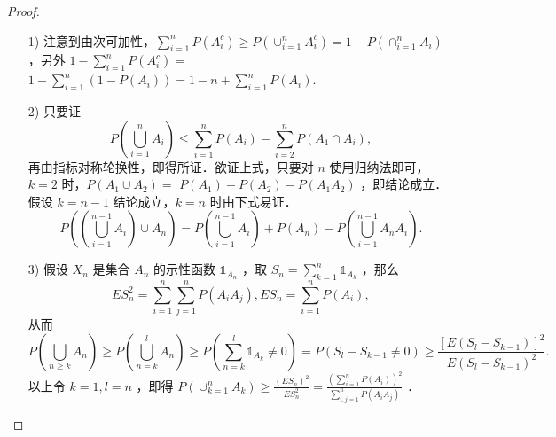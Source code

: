 \begin{proof}
    \begin{enumerate}
        \item[1)] 注意到由次可加性，$\sum_{i=1}^n P\left(A_i^c\right) \geq P\left(\cup_{i=1}^n A_i^c\right)=1-P\left(\cap_{i=1}^n A_i\right)$ ，另外 $1-\sum_{i=1}^n P\left(A_i^c\right)=$ $1-\sum_{i=1}^n\left(1-P\left(A_i\right)\right)=1-n+\sum_{i=1}^n P\left(A_i\right)$.
        \item[2)] 只要证
            $$
                P\left(\bigcup_{i=1}^n A_i\right) \leq \sum_{i=1}^n P\left(A_i\right)-\sum_{i=2}^n P\left(A_1 \cap A_i\right),
            $$
            再由指标对称轮换性，即得所证．欲证上式，只要对 $n$ 使用归纳法即可，$k=2$ 时，$P\left(A_1 \cup A_2\right)=$ $P\left(A_1\right)+P\left(A_2\right)-P\left(A_1 A_2\right)$ ，即结论成立．假设 $k=n-1$ 结论成立，$k=n$ 时由下式易证．
            $$
                P\left(\left(\bigcup_{i=1}^{n-1} A_i\right) \cup A_n\right)=P\left(\bigcup_{i=1}^{n-1} A_i\right)+P\left(A_n\right)-P\left(\bigcup_{i=1}^{n-1} A_n A_i\right) .
            $$
        \item[3)] 假设 $X_n$ 是集合 $A_n$ 的示性函数 $\mathbb{1}_{A_n}$ ，取 $S_n=\sum_{k=1}^n \mathbb{1}_{A_k}$ ，那么
            $$
                E S_n^2=\sum_{i=1}^n \sum_{j=1}^n P\left(A_i A_j\right), E S_n=\sum_{i=1}^n P\left(A_i\right),
            $$
            从而
            $$
                P\left(\bigcup_{n \geq k} A_n\right) \geq P\left(\bigcup_{n=k}^l A_n\right) \geq P\left(\sum_{n=k}^l \mathbb{1}_{A_k} \neq 0\right)=P\left(S_l-S_{k-1} \neq 0\right) \geq \frac{\left[E\left(S_l-S_{k-1}\right)\right]^2}{E\left(S_l-S_{k-1}\right)^2} .
            $$
            以上令 $k=1, l=n$ ，即得 $P\left(\cup_{k=1}^n A_k\right) \geq \frac{\left(E S_n\right)^2}{E S_n^2}=\frac{\left(\sum_{i=1}^n P\left(A_i\right)\right)^2}{\sum_{i, j=1}^n P\left(A_i A_j\right)}$ ．
    \end{enumerate}
\end{proof}

